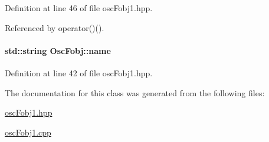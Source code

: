 \-Definition at line 46 of file osc\-Fobj1.\-hpp.



\-Referenced by operator()().

\hypertarget{classOscFobj_a27474ed25401a044c30395a44eeefcae}{
\paragraph[{name}]{\setlength{\rightskip}{0pt plus 5cm}std\-::string {\bf \-Osc\-Fobj\-::name}}}\label{classOscFobj_a27474ed25401a044c30395a44eeefcae}


\-Definition at line 42 of file osc\-Fobj1.\-hpp.



\-The documentation for this class was generated from the following files\-:\begin{DoxyCompactItemize}
\item 
\hyperlink{oscFobj1_8hpp}{osc\-Fobj1.\-hpp}\item 
\hyperlink{oscFobj1_8cpp}{osc\-Fobj1.\-cpp}\end{DoxyCompactItemize}
